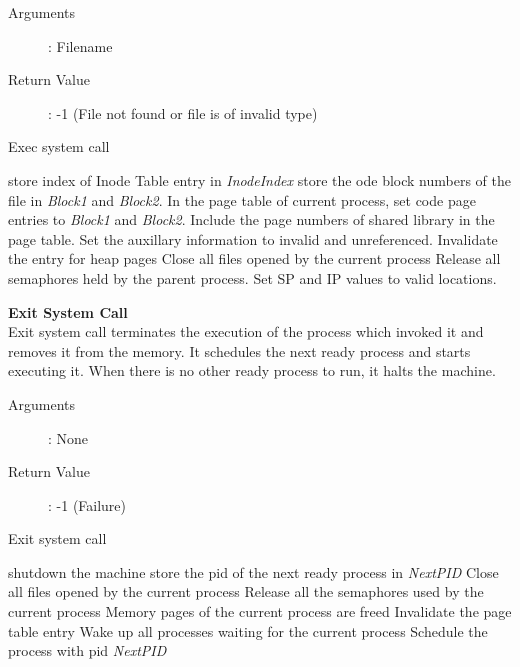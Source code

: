 \documentclass[10pt]{article}
\begin{document}
\begin{description}
\item[Arguments]: Filename
\item[Return Value]: -1 (File not found or file is of invalid type)
\end{description} 
\begin{algorithm}
\caption{Exec system call}
\begin{algorithmic}
\ELSE
    \ELSE
        \STATE store index of Inode Table entry in \textit{InodeIndex}
        \STATE store the ode block numbers of the file in \textit{Block1} and \textit{Block2}.
    \ENDIF
\ENDIF
\STATE In the page table of current process, set code page entries to \textit{Block1} and \textit{Block2}.
\STATE Include the page numbers of shared library in the page table.
\STATE Set the auxillary information to invalid and unreferenced.
\STATE Invalidate the entry for heap pages
\STATE Close all files opened by the current process
\STATE Release all semaphores held by the parent process.
\STATE Set SP and IP values to valid locations.
\end{algorithmic}
\end{algorithm}
\textbf{Exit System Call}\\
 Exit system call terminates the execution of the process which invoked it and removes it from the memory. It schedules the next ready process and starts executing it. When there is no other ready process to run, it halts the machine.
\begin{description}
\item[Arguments]: None
\item[Return Value]: -1 (Failure)
\end{description} 
\begin{algorithm}
\caption{Exit system call}
\begin{algorithmic}
    \STATE shutdown the machine
\ELSE 
    \STATE store the pid of the next ready process in \textit{NextPID}
\ENDIF
\STATE Close all files opened by the current process
\STATE Release all the semaphores used by the current process
\STATE Memory pages of the current process are freed
\STATE Invalidate the page table entry
\STATE Wake up all processes waiting for the current process
\STATE Schedule the process with pid \textit{NextPID}
\RETURN 
\end{algorithmic}
\end{algorithm}
\end{document}
